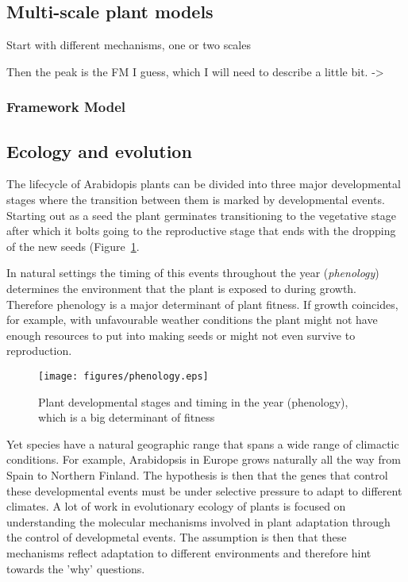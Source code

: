 \documentclass[phd]{infthesis}
\begin{document}
\subsection{Multi-scale plant models}
Start with different mechanisms, one or two scales

Then the peak is the FM I guess, which I will need to describe a little bit.
->
\subsubsection*{Framework Model}


\subsection{Ecology and evolution}
The lifecycle of Arabidopis plants can be divided into three major
developmental stages where the transition between them is marked by
developmental events. Starting out as a seed the plant germinates transitioning
to the vegetative stage after which it bolts going to the reproductive stage
that ends with the dropping of the new seeds (Figure~\ref{fig:plantLife}.

In natural settings the timing of this events throughout the year
(\emph{phenology}) determines the environment that the plant is exposed to
during growth. Therefore phenology is a major determinant of plant fitness. If
growth coincides, for example, with unfavourable weather conditions the plant
might not have enough resources to put into making seeds or might not even
survive to reproduction.

\begin{figure}[tb]
\centering
\texttt{[image: figures/phenology.eps]}
  \caption{Plant developmental stages and timing in the year (phenology), which
    is a big determinant of fitness}
\label{fig:plantLife}
\end{figure}

Yet species have a natural geographic range that spans a wide range of climactic
conditions. For example, Arabidopsis in Europe grows naturally all the way from
Spain to Northern Finland. The hypothesis is then that the genes that control
these developmental events must be under selective pressure to adapt to
different climates. A lot of work in evolutionary ecology of plants is focused
on understanding the molecular mechanisms involved in plant adaptation through
the control of developmetal events. The assumption is then that these mechanisms
reflect adaptation to different environments and therefore hint towards the
'why' questions.
\end{document}
